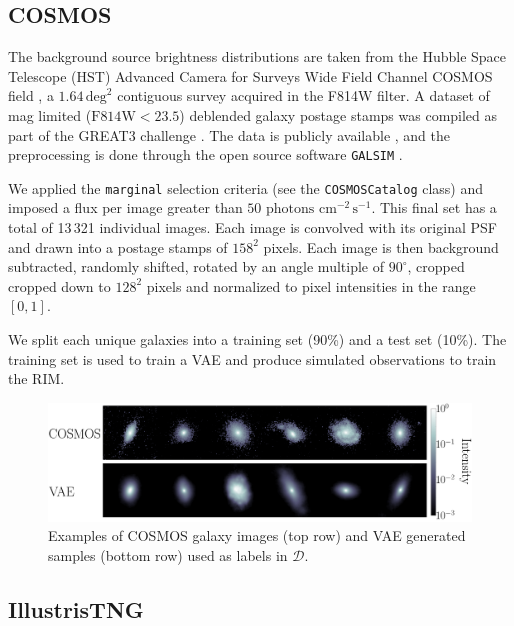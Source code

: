 \subsection{COSMOS}\label{sec:source}
The background source brightness distributions are taken from the Hubble Space Telescope (HST) 
Advanced Camera for Surveys Wide Field Channel COSMOS field \citep{Koekemoer2007,Scoville2007},
a $1.64\,\mathrm{deg}^{2}$ contiguous survey acquired in the F814W filter. 
A dataset of mag limited ($\mathrm{F814W} < 23.5$) deblended galaxy postage stamps \citep{Leauthaud2007} was compiled as 
part of the GREAT3 challenge \citep{Mandelbaum2014}. The data is 
publicly available \citep{Mandelbaum2012}, and the preprocessing is done through the open source software 
\texttt{GALSIM} \citep{Rowe2015}. \par

We applied the 
\texttt{marginal} selection criteria (see the \texttt{COSMOSCatalog} class) and imposed a flux per image
greater than $50\,\,\mathrm{photons}\,\,\mathrm{cm}^{-2}\,\mathrm{s}^{-1}$. 
This final set has a total of 13\,321 individual images.
Each image is convolved with its original PSF and drawn into a postage stamps of $158^2$ pixels. 
Each image is then 
background subtracted, randomly shifted, rotated by an angle multiple of $90^\circ$, cropped 
cropped down to $128^{2}$ pixels and normalized to pixel intensities in the range $[0,1]$.

We split each unique galaxies into a training set (90\%) and a test set (10\%). 
The training set is used to train a VAE and produce simulated observations 
to train the RIM.

\begin{figure}[t!]
        \centering
        \includegraphics[width=\linewidth]{figures/gal_vae_sample}
        \caption{Examples of COSMOS galaxy images 
                (top row) and VAE generated samples (bottom row) used as labels in $\mathcal{D}$.}
        \label{fig:source}
\end{figure}


\subsection{IllustrisTNG}\label{sec:kappa}
